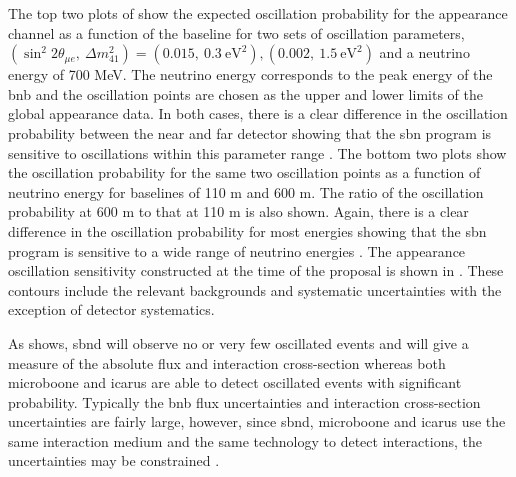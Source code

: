 The top two plots of  show the expected oscillation probability for the \nue appearance channel as a function of the baseline for two sets of oscillation parameters, $(\sin^2{2\theta_{\mu e}}, ~\Delta m^2_{41}) = (0.015, ~0.3~\text{eV}^2), (0.002, ~1.5~\text{eV}^2)$ and a neutrino energy of 700 MeV. The neutrino energy corresponds to the peak energy of the \gls{bnb} and the oscillation points are chosen as the upper and lower limits of the global \nue appearance data. In both cases, there is a clear difference in the oscillation probability between the near and far detector showing that the \gls{sbn} program is sensitive to oscillations within this parameter range \cite{SBN_paper}. The bottom two plots show the oscillation probability for the same two oscillation points as a function of neutrino energy for baselines of 110 m and 600 m. The ratio of the oscillation probability at 600 m to that at 110 m is also shown. Again, there is a clear difference in the oscillation probability for most energies showing that the \gls{sbn} program is sensitive to a wide range of neutrino energies \cite{SBN_paper}. The \nue appearance oscillation sensitivity constructed at the time of the proposal is shown in . These contours include the relevant backgrounds and systematic uncertainties with the exception of detector systematics. 

As  shows, \gls{sbnd} will observe no or very few oscillated events and will give a measure of the absolute flux and interaction cross-section whereas both \gls{microboone} and \gls{icarus} are able to detect oscillated events with significant probability. Typically the \gls{bnb} flux uncertainties and interaction cross-section uncertainties are fairly large, however, since \gls{sbnd}, \gls{microboone} and \gls{icarus} use the same
interaction medium and the same technology to detect interactions, the uncertainties may be constrained \cite{SBN_paper}.

